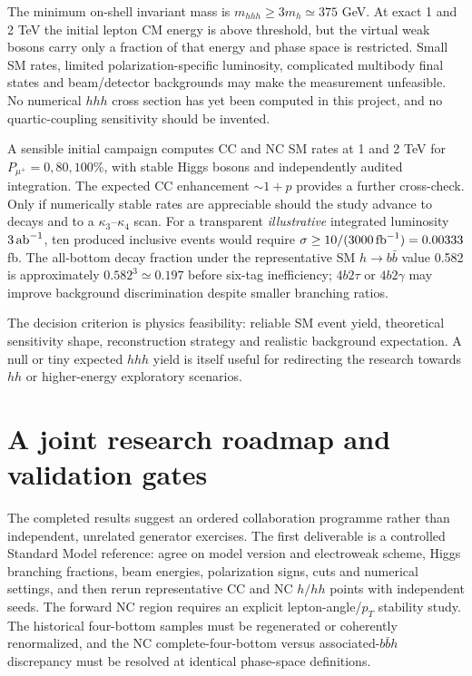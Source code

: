 \documentclass[12pt,a4paper]{article}
\newcommand{\newnote}{\clearpage}
\begin{document}
The minimum on-shell invariant mass is $m_{hhh}\ge3m_h\simeq375$ GeV. At exact 1 and 2 TeV the initial lepton CM energy is above threshold, but the virtual weak bosons carry only a fraction of that energy and phase space is restricted. Small SM rates, limited polarization-specific luminosity, complicated multibody final states and beam/detector backgrounds may make the measurement unfeasible. No numerical $hhh$ cross section has yet been computed in this project, and no quartic-coupling sensitivity should be invented.

A sensible initial campaign computes CC and NC SM rates at 1 and 2 TeV for $P_{\mu^+}=0,80,100\%$, with stable Higgs bosons and independently audited integration. The expected CC enhancement $\sim1+p$ provides a further cross-check. Only if numerically stable rates are appreciable should the study advance to decays and to a $\kappa_3$--$\kappa_4$ scan. For a transparent \emph{illustrative} integrated luminosity $3\,{\rm ab}^{-1}$, ten produced inclusive events would require $\sigma\ge10/(3000\,{\rm fb}^{-1})=0.00333$ fb. The all-bottom decay fraction under the representative SM $h\to b\bar b$ value 0.582 is approximately $0.582^3\simeq0.197$ before six-tag inefficiency; $4b2\tau$ or $4b2\gamma$ may improve background discrimination despite smaller branching ratios.

The decision criterion is physics feasibility: reliable SM event yield, theoretical sensitivity shape, reconstruction strategy and realistic background expectation. A null or tiny expected $hhh$ yield is itself useful for redirecting the research towards $hh$ or higher-energy exploratory scenarios.




\newnote

\section{A joint research roadmap and validation gates}
The completed results suggest an ordered collaboration programme rather than independent, unrelated generator exercises. The first deliverable is a controlled Standard Model reference: agree on model version and electroweak scheme, Higgs branching fractions, beam energies, polarization signs, cuts and numerical settings, and then rerun representative CC and NC $h/hh$ points with independent seeds. The forward NC region requires an explicit lepton-angle/$p_T$ stability study. The historical four-bottom samples must be regenerated or coherently renormalized, and the NC complete-four-bottom versus associated-$b\bar b h$ discrepancy must be resolved at identical phase-space definitions.
\end{document}
